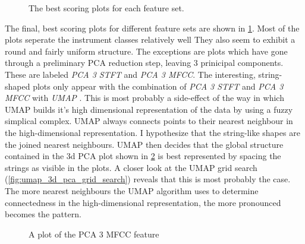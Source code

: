 \documentclass[a4paper, 12pt, twoside]{report}
\begin{document}
\begin{figure}[h!tbp]
\centering
{}
\caption{\label{fig:best_overall}The best scoring plots for each feature set.}
\end{figure}

The final, best scoring plots for different feature sets are shown in \ref{fig:best_overall}. Most of the plots seperate the instrument classes relatively well They also seem to exhibit a round and fairly uniform structure. The exceptions are plots which have gone through a preliminary PCA reduction step, leaving 3 prinicipal components. These are labeled \textit{PCA 3 STFT} and \textit{PCA 3 MFCC}. The interesting, string-shaped plots only appear with the combination of \textit{ PCA 3 STFT } and \textit{ PCA 3 MFCC } with \textit{ UMAP }. This is most probably a side-effect of the way in which UMAP builds it's high dimensional representation of the data by using a fuzzy simplical complex. UMAP always connects points to their nearest neighbour in the high-dimensional representation. I hypothesize that the string-like shapes are the joined nearest neighbours. UMAP then decides that the global structure contained in the 3d PCA plot shown in \ref{fig:3d_pca} is best represented by spacing the strings as visible in the plots. A closer look at the UMAP grid search (\ref{fig:umap_3d_pca_grid_search}) reveals that this is most probably  the case. The more nearest neighbours the UMAP algorithm uses to determine connectedness in the high-dimensional representation, the more pronounced becomes the pattern.

\begin{figure}[h!b]
\centering
{}
\caption{\label{fig:3d_pca}A plot of the PCA 3 MFCC feature}
\end{figure}
\end{document}
